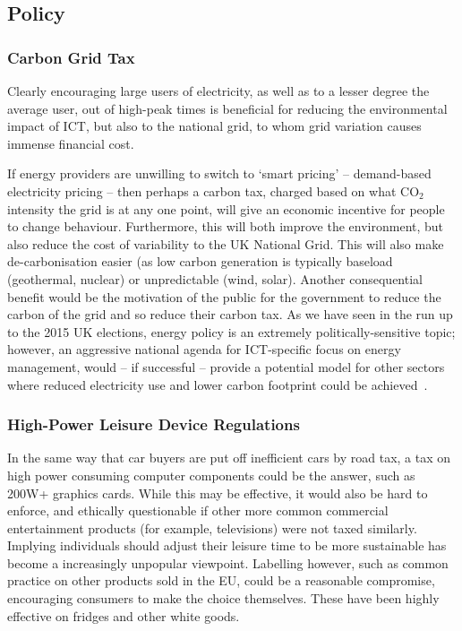\documentclass[conference]{IEEEtran}
\begin{document}
\subsection{Policy}

\subsubsection{Carbon Grid Tax}

Clearly encouraging large users of electricity, as well as to a lesser
degree the average user, out of high-peak times is beneficial for
reducing the environmental impact of ICT, but also to the national
grid, to whom grid variation causes immense financial cost.

If energy providers are unwilling to switch to `smart pricing' --
demand-based electricity pricing -- then perhaps a
carbon tax, charged based on what CO$_2$ intensity the grid is at any
one point, will give an economic incentive for people to change
behaviour. Furthermore, this will both improve the environment, but
also reduce the cost of variability to the UK National Grid. This will
also make de-carbonisation easier (as low carbon generation is
typically baseload (geothermal, nuclear) or unpredictable (wind,
solar). Another consequential benefit would be the motivation of the
public for the government to reduce the carbon of the grid and so
reduce their carbon tax. As we have seen in the run up to the 2015 UK
elections, energy policy is an extremely politically-sensitive topic;
however, an aggressive national agenda for ICT-specific focus on
energy management, would -- if successful -- provide a potential model
for other sectors where reduced electricity use and lower carbon
footprint could be achieved~\cite{smart2020:2008,ruth:2011}.

\subsubsection{High-Power Leisure Device Regulations}

In the same way that car buyers are put off inefficient cars by road
tax, a tax on high power consuming computer components could be the
answer, such as 200W+ graphics cards. While this may be effective, it
would also be hard to enforce, and ethically questionable if other
more common commercial entertainment products (for example,
televisions) were not taxed similarly. Implying individuals should
adjust their leisure time to be more sustainable has become a
increasingly unpopular viewpoint. Labelling however, such as common
practice on other products sold in the EU, could be a reasonable
compromise, encouraging consumers to make the choice themselves. These
have been highly effective on fridges and other white goods.
\end{document}
